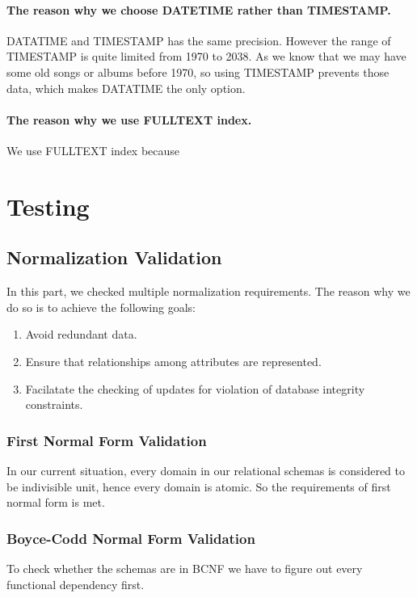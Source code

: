 \documentclass[letter, 12pt]{report}
\begin{document}
	\subsubsection{The reason why we choose DATETIME rather than TIMESTAMP.}
	DATATIME and TIMESTAMP has the same precision. However the range of TIMESTAMP is quite limited from 1970 to 2038. As we know that we may have some old songs or albums before 1970, so using TIMESTAMP prevents those data, which makes DATATIME the only option.
	
	\subsubsection{The reason why we use FULLTEXT index.}
	We use FULLTEXT index because 
	\chapter{Testing}
	
	\section{Normalization Validation}
	In this part, we checked multiple normalization requirements. The reason why we do so is to achieve the following goals:
	\begin{enumerate}
		\item 
		Avoid redundant data.
		\item 
		Ensure that relationships among attributes are represented.
		\item 
		Facilatate the checking of updates for violation of database integrity constraints.
	\end{enumerate}
	\subsection{First Normal Form Validation}
	In our current situation, every domain in our relational schemas is considered to be indivisible unit, hence every domain is atomic. So the requirements of first normal form is met.
	\subsection{Boyce-Codd Normal Form Validation}
	To check whether the schemas are in BCNF we have to figure out every functional dependency first.
\end{document}
